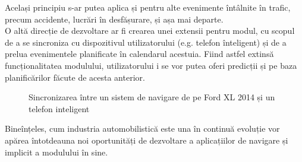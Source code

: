 Același principiu s-ar putea aplica și pentru alte evenimente întâlnite în trafic, precum accidente, lucrări în desfășurare, și așa mai departe.
\vspace{6pt}
\\O altă direcție de dezvoltare ar fi crearea unei extensii pentru modul, cu scopul de a se sincroniza cu dispozitivul utilizatorului (e.g. telefon înteligent) și de a prelua evenimentele planificate în calendarul acestuia. Fiind astfel extinsă funcționalitatea modulului, utilizatorului i se vor putea oferi predicții și pe baza planificărilor făcute de acesta anterior.

\begin{figure}[h!]
  \centering
  \caption{Sincronizarea între un sistem de navigare de pe Ford XL 2014 și un telefon inteligent}
  \end{figure}	

Bineînțeles, cum industria automobilistică este una în continuă evoluție vor apărea întotdeauna noi oportunități de dezvoltare a aplicațiilor de navigare și implicit a modulului în sine.